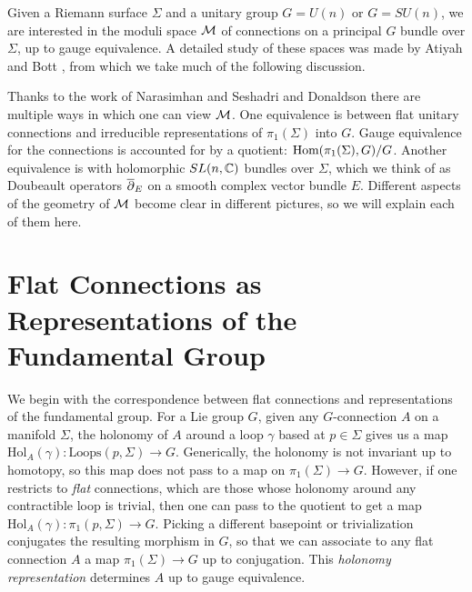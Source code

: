 
	Given a Riemann surface $\Sigma$ and a unitary group $G=U(n)$ or $G=SU(n)$, we are interested in the moduli space $\mathcal{M}$ of connections on a principal $G$ bundle over $\Sigma$, up to gauge equivalence. A detailed study of these spaces was made by Atiyah and Bott \cite{atiyah_yang-mills_1983}, from which we take much of the following discussion.
	
	Thanks to the work of Narasimhan and Seshadri and Donaldson \cite{donaldson_new_1983}\cite{narasimhan_stable_1965} there are multiple ways in which one can view $\mathcal{M}$. One equivalence is between flat unitary connections and irreducible representations of $\pi_1(\Sigma)$ into $G$.
	Gauge equivalence for the connections is accounted for by a quotient: $\text{Hom}(\pi_1(\Sigma), G)/ G$. Another equivalence is with holomorphic $SL(n,\mathbb{C})$ bundles over $\Sigma$, which we think of as Doubeault operators $\overline{\partial}_E$ on a smooth complex vector bundle $E$. Different aspects of the geometry of $\mathcal{M}$ become clear in different pictures, so we will explain each of them here. 
	
	\section{Flat Connections as Representations of the Fundamental Group}
	\label{s:vectorbundles}
	We begin with the correspondence between flat connections and representations of the fundamental group. For a Lie group $G$, given any $G$-connection $A$ on a manifold $\Sigma$, the holonomy of $A$ around a loop $\gamma$ based at $p\in \Sigma$ gives us a map $\text{Hol}_A(\gamma):\text{Loops}(p,\Sigma)\to G$. Generically, the holonomy is not invariant up to homotopy, so this map does not pass to a map on $\pi_1(\Sigma) \to G$. However, if one restricts to \emph{flat} connections, which are those whose holonomy around any contractible loop is trivial, then one can pass to the quotient to get a map $\text{Hol}_A(\gamma):\pi_1(p,\Sigma)\to G$. Picking a different basepoint or trivialization conjugates the resulting morphism in $G$, so that we can associate to any flat connection $A$ a map $\pi_1(\Sigma)\to G$ up to conjugation. This \emph{holonomy representation} determines $A$ up to gauge equivalence.
	

